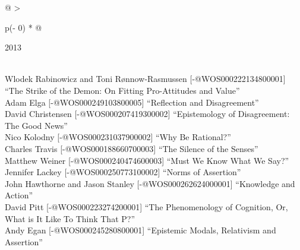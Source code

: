 \documentclass[
  10pt,
  letterpaper,
  DIV=11,
  numbers=noendperiod,
  twoside]{scrartcl}
\begin{document}
\begin{longtable}[]{@{}
  >{\raggedright\arraybackslash}p{(\columnwidth - 0\tabcolsep) * }@{}}

\caption{\label{tbl-top-ten-2004}Most cited articles published less than
ten years ago as of 2013.}

\tabularnewline

\toprule\noalign{}
\begin{minipage}[b]{\linewidth}\raggedright
2013
\end{minipage} \\
\midrule\noalign{}
\endhead
\bottomrule\noalign{}
\endlastfoot
Wlodek Rabinowicz and Toni Rønnow‐Rasmussen {[}-@WOS000222134800001{]}
``The Strike of the Demon: On Fitting Pro-Attitudes and Value'' \\
Adam Elga {[}-@WOS000249103800005{]} ``Reflection and Disagreement'' \\
David Christensen {[}-@WOS000207419300002{]} ``Epistemology of
Disagreement: The Good News'' \\
Nico Kolodny {[}-@WOS000231037900002{]} ``Why Be Rational?'' \\
Charles Travis {[}-@WOS000188660700003{]} ``The Silence of the
Senses'' \\
Matthew Weiner {[}-@WOS000240474600003{]} ``Must We Know What We
Say?'' \\
Jennifer Lackey {[}-@WOS000250773100002{]} ``Norms of Assertion'' \\
John Hawthorne and Jason Stanley {[}-@WOS000262624000001{]} ``Knowledge
and Action'' \\
David Pitt {[}-@WOS000223274200001{]} ``The Phenomenology of Cognition,
Or, What is It Like To Think That P?'' \\
Andy Egan {[}-@WOS000245280800001{]} ``Epistemic Modals, Relativism and
Assertion'' \\

\end{longtable}
\end{document}
